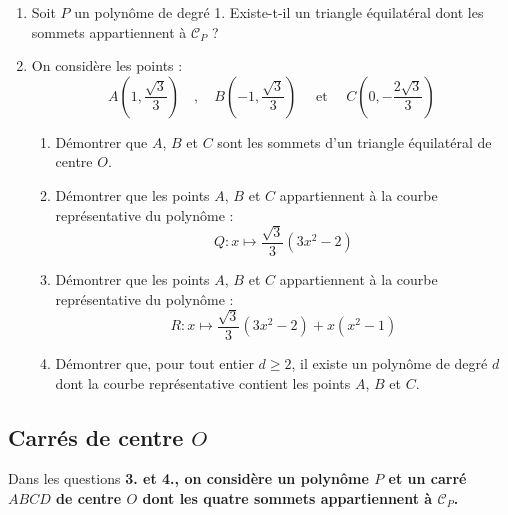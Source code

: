 \documentclass[landscape,twocolumn,leqno,a4paper,10pt]{report} %
\renewcommand{\geq}{\geqslant}
\renewcommand{\textbf}[1]{\begingroup\bfseries\mathversion{bold}#1\endgroup}		%
\begin{document}
\begin{enumerate}
	\item Soit $P$ un polynôme de degré 1. Existe-t-il un triangle équilatéral dont les sommets appartiennent à $\mathscr{C}_{P}$ ?
	\item On considère les points :
	$$A\left(1, \frac{\sqrt{3}}{3}\right)\quad,\quad B\left(-1, \frac{\sqrt{3}}{3}\right) \quad\text { et }\quad C\left(0,-\frac{2 \sqrt{3}}{3}\right)$$
	\begin{enumerate}
		\item Démontrer que $A$, $B$ et $C$ sont les sommets d'un triangle équilatéral de centre $O$.
		\item Démontrer que les points $A$, $B$ et $C$ appartiennent à la courbe représentative du polynôme :
		$$Q: x \mapsto \frac{\sqrt{3}}{3}\left(3 x^{2}-2\right)$$
		\item Démontrer que les points $A$, $B$ et $C$ appartiennent à la courbe représentative du polynôme :
		$$R: x \mapsto \frac{\sqrt{3}}{3}\left(3 x^{2}-2\right)+x\left(x^{2}-1\right)$$
		\item Démontrer que, pour tout entier $d \geq 2$, il existe un polynôme de degré $d$ dont la courbe représentative contient les points $A$, $B$ et $C$.
	\end{enumerate}
\end{enumerate}

\subsection{Carrés de centre $O$}


Dans les questions \textbf{3.} et \textbf{4.}, on considère un polynôme $P$ et un carré $ABCD$ de centre $O$ dont les quatre sommets appartiennent à $\mathscr{C}_{P}$.
\end{document}
